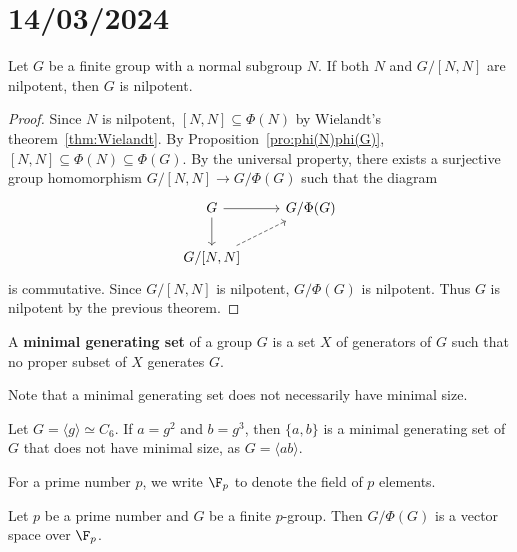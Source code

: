 \section{14/03/2024}

\begin{theorem}[Hall]
\label{thm:Hall_nilpotent}
Let $G$ be a finite group with a normal subgroup $N$. If both $N$ and 
$G/[N,N]$ are nilpotent, then $G$ is nilpotent.
\end{theorem}

\begin{proof}
Since $N$ is nilpotent, $[N,N]\subseteq\Phi(N)$ by 
Wielandt's theorem~\ref{thm:Wielandt}. 
By Proposition~\ref{pro:phi(N)phi(G)},
$[N,N]\subseteq\Phi(N)\subseteq\Phi(G)$. 
By the universal property, there exists a surjective group homomorphism 
$G/[N,N]\to G/\Phi(G)$ such that the diagram 
    \[
    \begin{tikzcd}
	G & {G/\Phi(G)} \\
	{G/[N,N]}
	\arrow[from=1-1, to=1-2]
	\arrow[from=1-1, to=2-1]
	\arrow[dashed, from=2-1, to=1-2]
    \end{tikzcd}
    \]
is commutative. Since $G/[N,N]$ is nilpotent, $G/\Phi(G)$ is nilpotent. Thus $G$ is nilpotent by the previous theorem. 
\end{proof}

\begin{definition}
A \textbf{minimal generating set} of a group $G$ is a set 
$X$ of generators of $G$ such that no proper subset of $X$ generates $G$. 
\end{definition}

Note that a minimal generating set does not necessarily have minimal size. 
	
\begin{example}
Let $G=\langle g\rangle\simeq C_6$.  If $a=g^2$ and 
$b=g^3$, then $\{a,b\}$ is a minimal generating set of $G$ that does not have
minimal size, as $G=\langle ab\rangle$.
\end{example}
	
For a prime number $p$, we write $\F_p$ to denote the field of $p$ elements. 

\begin{lemma}
\label{lem:Burnside:minimal}
Let $p$ be a prime number and 
$G$ be a finite $p$-group. Then $G/\Phi(G)$ is a vector space over $\F_p$.
\end{lemma}

